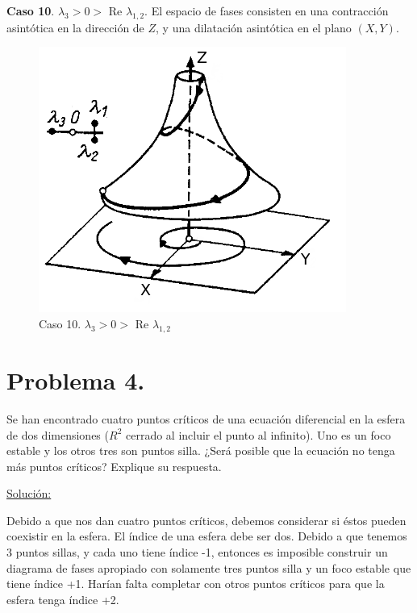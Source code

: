 \documentclass[a4paper,10pt]{article}
\numberwithin{equation}{section}
\begin{document}
\textbf{Caso 10}. $\lambda_3 > 0 > $ Re $\lambda_{1,2}$. El espacio de fases consisten en una contracción asintótica
en la dirección de $Z$, y una dilatación asintótica en el plano $(X,Y)$.

\begin{figure}[H]
 \centering
\includegraphics[scale=0.35]{problema3fig11}
\caption{Caso 10. $\lambda_3 > 0 > $ Re $\lambda_{1,2}$}
\label{fig:problema3fig11}
\end{figure}
\vspace{.3cm}

\section{Problema 4.}

Se han encontrado cuatro puntos críticos de una ecuación diferencial en la esfera
de dos dimensiones ($R^2$ cerrado al incluir el punto al infinito). Uno es un foco
estable y los otros tres son puntos silla. ¿Será posible que la ecuación no tenga
más puntos críticos? Explique su respuesta.


\vspace{.3cm}

\underline{Solución:}\vspace{.3cm}

Debido a que nos dan cuatro puntos críticos, debemos considerar si éstos pueden coexistir
en la esfera. El índice de una esfera debe ser dos. Debido a que tenemos 3 puntos sillas,
y cada uno tiene índice -1, entonces es imposible construir un diagrama de fases apropiado
con solamente tres puntos silla y un foco estable que tiene índice +1. Harían falta completar 
con otros puntos críticos para que la esfera tenga índice +2. 
\end{document}
